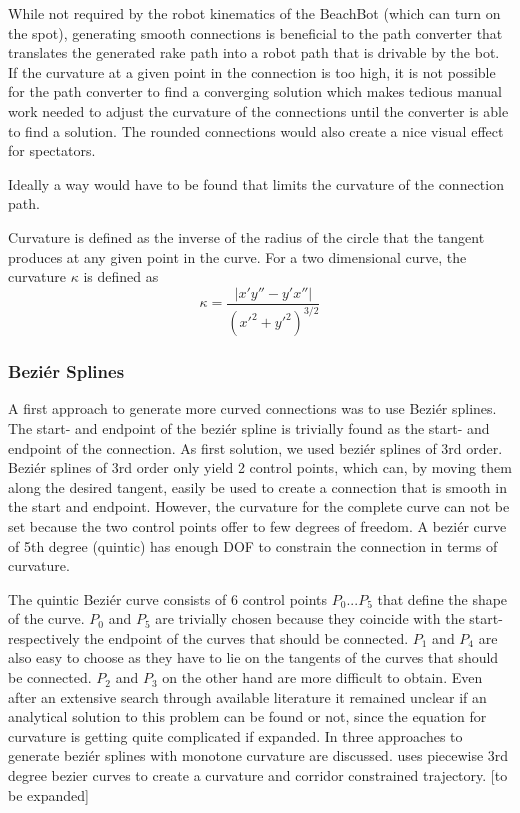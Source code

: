 While not required by the robot kinematics of the BeachBot (which can turn on the spot), generating smooth connections is beneficial to the path converter that translates the generated rake path into a robot path that is drivable by the bot. If the curvature at a given point in the connection is too high, it is not possible for the path converter to find a converging solution which makes tedious manual work needed to adjust the curvature of the connections until the converter is able to find a solution. The rounded connections would also create a nice visual effect for spectators.

Ideally a way would have to be found that limits the curvature of the connection path.

Curvature is defined as the inverse of the radius of the circle that the tangent produces at any given point in the curve. For a two dimensional curve, the curvature $\kappa$ is defined as 
$$\kappa = \frac{|x'y''-y'x''|}{(x'^2+y'^2)^{3/2}}$$


\subsubsection{Beziér Splines}

A first approach to generate more curved connections was to use Beziér splines.
The start- and endpoint of the beziér spline is trivially found as the start- and endpoint of the connection. As first solution, we used beziér splines of 3rd order. Beziér splines of 3rd order only yield 2 control points, which can, by moving them along the desired tangent, easily be used to create a connection that is smooth in the start and endpoint. However, the curvature for the complete curve can not be set because the two control points offer to few degrees of freedom. A beziér curve of 5th degree (quintic) has enough DOF to constrain the connection in terms of curvature.

The quintic Beziér curve consists of 6 control points $P_0 ... P_5$ that define the shape of the curve. $P_0$ and $P_5$ are trivially chosen because they coincide with the start- respectively the endpoint of the curves that should be connected. $P_1$ and $P_4$ are also easy to choose as they have to lie on the tangents of the curves that should be connected. $P_2$ and $P_3$ on the other hand are more difficult to obtain. Even after an extensive search through available literature it remained unclear if an analytical solution to this problem can be found or not, since the equation for curvature is getting quite complicated if expanded. In \cite{doi:10.1137/1.9781611971521.ch5} three approaches to generate beziér splines with monotone curvature are discussed. \cite{choi2010piecewise} uses piecewise 3rd degree bezier curves to create a curvature and corridor constrained trajectory.  [to be expanded]

